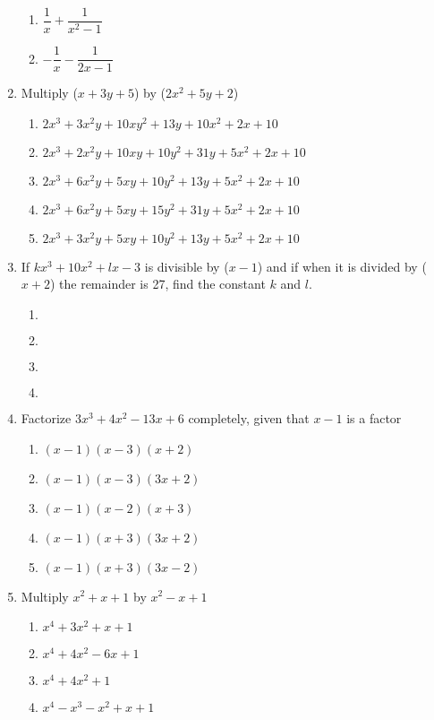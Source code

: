 \begin{multicols}{2}
\begin{enumerate}[label={\arabic*.}]
\begin{enumerate}[label={\Alph*.}]
	\item \(\dfrac{1}{x} + \dfrac{1}{{x}^{2} - 1}\)
	\item \(-\dfrac{1}{x} - \dfrac{1}{2x - 1}\)
	\end{enumerate}
\item Multiply (\(x + 3y + 5\)) by (\(2{x}^{2} + 5y + 2\))
	\begin{enumerate}[label={\Alph*.}]
	\item \(2{x}^{3} + 3{x}^{2}y + 10xy^2 + 13y + 10{x}^{2} + 2x + 10\)
	\item \(2{x}^{3} + 2{x}^{2}y + 10xy + 10y^2 +  31y + 5{x}^{2} + 2x + 10\)
	\item \(2{x}^{3} + 6{x}^{2}y + 5xy + 10y^2 + 13y + 5{x}^{2} + 2x + 10\)
	\item \(2{x}^{3} + 6{x}^{2}y + 5xy + 15y^2 + 31y + 5{x}^{2} + 2x + 10\)
	\item \(2{x}^{3} + 3{x}^{2}y + 5xy + 10y^2 + 13y + 5{x}^{2} + 2x + 10\)
	\end{enumerate}
\item If \(k{x}^{3} + 	10{x}^{2} + lx - 3\) is divisible by (\(x - 1\)) and if when it is divided by (\(x + 2\)) the remainder is 27,
find the constant \(k\) and \(l\).
	\begin{enumerate}[label={\Alph*.}]
	\item \(\)
	\item \(\)
	\item \(\)
	\item \(\)
	\end{enumerate}
\item Factorize \(3{x}^{3} + 4{x}^{2} - 13x + 6\) completely, given that \(x - 1\) is a factor
	\begin{enumerate}[label={\Alph*.}]
	\item \((x-1)(x-3)(x+2)\)
	\item \((x-1)(x-3)(3x+2)\)
	\item \((x-1)(x-2)(x+3)\)
	\item \((x-1)(x+3)(3x+2)\)
	\item \((x-1)(x+3)(3x-2)\)
	\end{enumerate}
\item Multiply \({x}^{2}+x+1\) by \({x}^{2}-x+1\)
	\begin{enumerate}[label={\Alph*.}]
	\item \(x^4+3{x}^{2}+x+1\)
	\item \(x^4+4{x}^{2}-6x+1\)
	\item \(x^4+4{x}^{2}+1\)
	\item \(x^4-{x}^{3}-{x}^{2}+x+1\)

\end{enumerate}
\end{enumerate}
\end{multicols}

